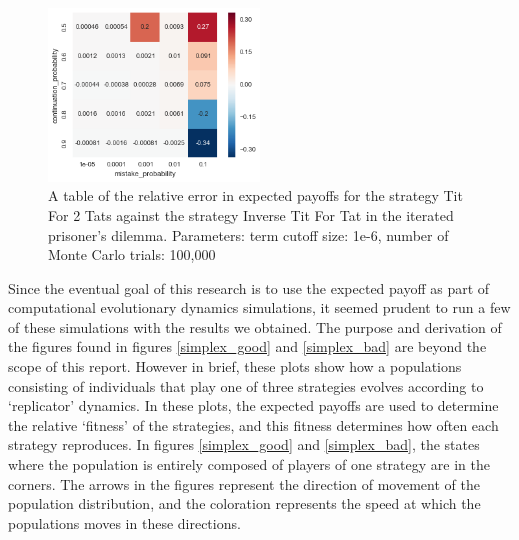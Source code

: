 \documentclass[a4paper,12pt]{article}
\begin{document}
\begin{figure}
    \caption{A table of the relative error in expected payoffs for the strategy Tit For 2 Tats against the strategy Inverse Tit For Tat in the iterated prisoner's dilemma. Parameters: term cutoff size: 1e-6, number of Monte Carlo trials: 100,000}
    \label{error_table}
    \centering
        \includegraphics[width=0.5\textwidth]{error_table}
\end{figure}

Since the eventual goal of this research is to use the expected payoff as part of computational evolutionary dynamics simulations, it seemed prudent to run a few of these simulations with the results we obtained.
The purpose and derivation of the figures found in figures \ref{simplex_good} and \ref{simplex_bad} are beyond the scope of this report.
However in brief, these plots show how a populations consisting of individuals that play one of three strategies evolves according to `replicator' dynamics.
In these plots, the expected payoffs are used to determine the relative `fitness' of the strategies, and this fitness determines how often each strategy reproduces.
In figures \ref{simplex_good} and \ref{simplex_bad}, the states where the population is entirely composed of players of one strategy are in the corners.
The arrows in the figures represent the direction of movement of the population distribution, and the coloration represents the speed at which the populations moves in these directions.
\end{document}
